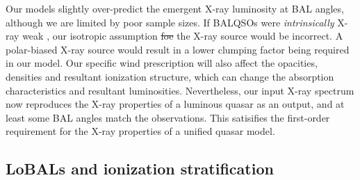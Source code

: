 \documentclass[useAMS,usenatbib]{mn2e_x}
\providecommand{\DIFadd}[1]{{\protect\color{blue}\uwave{#1}}} %
\providecommand{\DIFdel}[1]{{\protect\color{red}\sout{#1}}}                      %
\providecommand{\DIFaddbegin}{} %
\providecommand{\DIFaddend}{} %
\providecommand{\DIFdelbegin}{} %
\providecommand{\DIFdelend}{} %
\begin{document}
Our models slightly over-predict the emergent X-ray luminosity at BAL angles, 
although we are limited by poor sample sizes. 
If BALQSOs were {\em intrinsically} 
X-ray weak \citep[as suggested by, e.g.][]{morabito2013},
our isotropic assumption \DIFdelbegin \DIFdel{foe }\DIFdelend \DIFaddbegin \DIFadd{for }\DIFaddend the X-ray source would be incorrect. 
A polar-biased X-ray source would result in a lower clumping factor being
required in our model. Our specific wind
prescription will also affect the opacities, densities and resultant
ionization structure, which can change the absorption characteristics and resultant
luminosities.
Nevertheless, our input X-ray spectrum
now reproduces the X-ray properties of a luminous quasar as an output,
and at least some BAL angles match the observations.
This satisifies the first-order requirement for the X-ray properties of 
a unified quasar model.




\subsection{LoBALs and ionization stratification}
\end{document}
